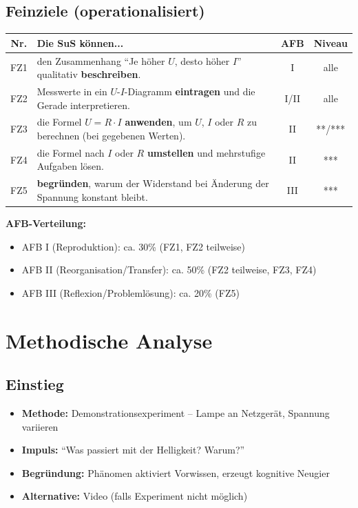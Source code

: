 \documentclass[11pt,a4paper]{article}
\begin{document}
\subsection{Feinziele (operationalisiert)}
\begin{tabular}{|c|p{8cm}|c|c|}
\hline
\textbf{Nr.} & \textbf{Die SuS können...} & \textbf{AFB} & \textbf{Niveau} \\
\hline
FZ1 & den Zusammenhang ``Je höher $U$, desto höher $I$'' qualitativ \textbf{beschreiben}. & I & alle \\
\hline
FZ2 & Messwerte in ein $U$-$I$-Diagramm \textbf{eintragen} und die Gerade interpretieren. & I/II & alle \\
\hline
FZ3 & die Formel $U = R \cdot I$ \textbf{anwenden}, um $U$, $I$ oder $R$ zu berechnen (bei gegebenen Werten). & II & **/*** \\
\hline
FZ4 & die Formel nach $I$ oder $R$ \textbf{umstellen} und mehrstufige Aufgaben lösen. & II & *** \\
\hline
FZ5 & \textbf{begründen}, warum der Widerstand bei Änderung der Spannung konstant bleibt. & III & *** \\
\hline
\end{tabular}

\vspace{1em}
\textbf{AFB-Verteilung:}
\begin{itemize}
    \item AFB I (Reproduktion): ca. 30\% (FZ1, FZ2 teilweise)
    \item AFB II (Reorganisation/Transfer): ca. 50\% (FZ2 teilweise, FZ3, FZ4)
    \item AFB III (Reflexion/Problemlösung): ca. 20\% (FZ5)
\end{itemize}

\section{Methodische Analyse}

\subsection{Einstieg}
\begin{itemize}
    \item \textbf{Methode:} Demonstrationsexperiment -- Lampe an Netzgerät, Spannung variieren
    \item \textbf{Impuls:} ``Was passiert mit der Helligkeit? Warum?''
    \item \textbf{Begründung:} Phänomen aktiviert Vorwissen, erzeugt kognitive Neugier
    \item \textbf{Alternative:} Video (falls Experiment nicht möglich)
\end{itemize}
\end{document}

